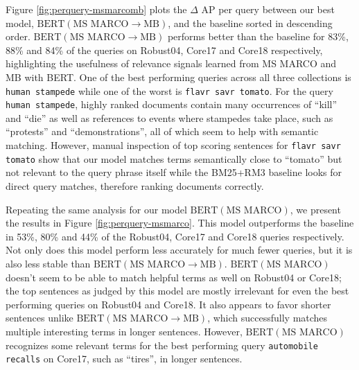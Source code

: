 Figure \ref{fig:perquery-msmarcomb} plots the $\Delta$ AP per query between our best model, $ \textrm{BERT}(\textrm{MS MARCO}\rightarrow\textrm{MB}) $, and the baseline sorted in descending order.
$ \textrm{BERT}(\textrm{MS MARCO}\rightarrow\textrm{MB}) $ performs better than the baseline for 83\%, 88\% and 84\% of the queries on Robust04, Core17 and Core18 respectively, highlighting the usefulness of relevance signals learned from MS MARCO and MB with BERT.
One of the best performing queries across all three collections is \texttt{human stampede} while one of the worst is \texttt{flavr savr tomato}.
For the query \texttt{human stampede}, highly ranked documents contain many occurrences of ``kill'' and ``die'' as well as references to events where stampedes take place, such as ``protests'' and ``demonstrations'', all of which seem to help with semantic matching.
However, manual inspection of top scoring sentences for \texttt{flavr savr tomato} show that our model matches terms semantically close to ``tomato'' but not relevant to the query phrase itself while the BM25+RM3 baseline looks for direct query matches, therefore ranking documents correctly.

Repeating the same analysis for our model $ \textrm{BERT}(\textrm{MS MARCO}) $, we present the results in Figure \ref{fig:perquery-msmarco}.
This model outperforms the baseline in 53\%, 80\% and 44\% of the Robust04, Core17 and Core18 queries respectively.
Not only does this model perform less accurately for much fewer queries, but it is also less stable than $ \textrm{BERT}(\textrm{MS MARCO}\rightarrow\textrm{MB}) $.
$ \textrm{BERT}(\textrm{MS MARCO}) $ doesn't seem to be able to match helpful terms as well on Robust04 or Core18; the top sentences as judged by this model are mostly irrelevant for even the best performing queries on Robust04 and Core18.
It also appears to favor shorter sentences unlike $ \textrm{BERT}(\textrm{MS MARCO}\rightarrow\textrm{MB}) $, which successfully matches multiple interesting terms in longer sentences.
However, $ \textrm{BERT}(\textrm{MS MARCO}) $ recognizes some relevant terms for the best performing query \texttt{automobile recalls} on Core17, such as ``tires'', in longer sentences.


